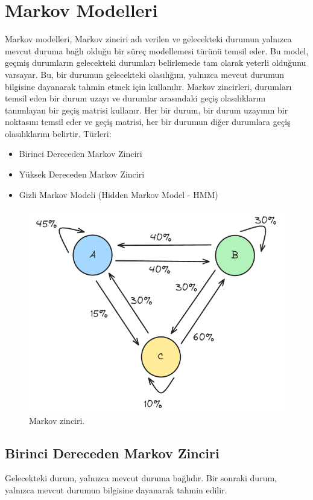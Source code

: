\section{Markov Modelleri}
Markov modelleri, Markov zinciri adı verilen ve gelecekteki durumun yalnızca mevcut duruma bağlı olduğu bir süreç modellemesi türünü temsil eder. Bu model, geçmiş durumların gelecekteki durumları belirlemede tam olarak yeterli olduğunu varsayar. Bu, bir durumun gelecekteki olasılığını, yalnızca mevcut durumun bilgisine dayanarak tahmin etmek için kullanılır. Markov zincirleri, durumları temsil eden bir durum uzayı ve durumlar arasındaki geçiş olasılıklarını tanımlayan bir geçiş matrisi kullanır. Her bir durum, bir durum uzayının bir noktasını temsil eder ve geçiş matrisi, her bir durumun diğer durumlara geçiş olasılıklarını belirtir. Türleri:
\begin{itemize}
    \item Birinci Dereceden Markov Zinciri
    \item Yüksek Dereceden Markov Zinciri
    \item Gizli Markov Modeli (Hidden Markov Model - HMM)
\end{itemize}

\begin{figure}[h]
    \centering
    \includegraphics[width=1\textwidth]{images/markov_chains.png}
    \caption{Markov zinciri.}
    \label{fig:enter-label}
\end{figure}

\subsection{Birinci Dereceden Markov Zinciri}
Gelecekteki durum, yalnızca mevcut duruma bağlıdır. Bir sonraki durum, yalnızca mevcut durumun bilgisine dayanarak tahmin edilir.

